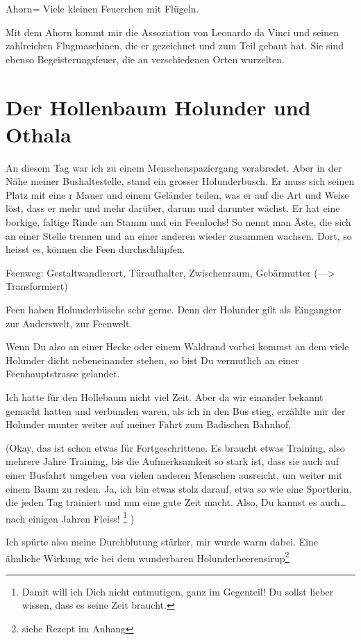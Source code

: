 \documentclass[11pt,titlepage,a5paper]{book}
\begin{document}
Ahorn= Viele kleinen Feuerchen mit Flügeln.

Mit dem Ahorn kommt mir die Assoziation von Leonardo da Vinci und seinen zahlreichen Flugmaschinen, die er gezeichnet und zum Teil gebaut hat. Sie sind ebenso Begeisterungsfeuer, die an verschiedenen Orten wurzelten.

\section{Der Hollenbaum Holunder und Othala  }

An diesem Tag war ich zu einem Menschenspaziergang verabredet. Aber in der Nähe meiner Bushaltestelle, stand ein grosser Holunderbusch. Er muss sich seinen Platz mit eine r Mauer und einem Geländer teilen, was er auf die Art und Weise löst, dass er mehr und mehr darüber, darum und darunter wächst. Er hat eine borkige, faltige Rinde am Stamm und ein Feenlochs! So nennt man Äste, die sich an einer Stelle trennen und an einer anderen wieder zusammen wachsen. Dort, so heisst es, können die Feen durchschlüpfen. 

Feenweg: Gestaltwandlerort, Türaufhalter, Zwischenraum, Gebärmutter (---> Transformiert)

Feen haben Holunderbüsche sehr gerne. Denn der Holunder gilt als Eingangtor zur Anderswelt, zur Feenwelt.

Wenn Du also an einer Hecke oder einem Waldrand vorbei kommst an dem viele Holunder dicht nebeneinander stehen, so bist Du vermutlich an einer Feenhauptstrasse gelandet.

Ich hatte für den Hollebaum nicht viel Zeit. Aber da wir einander bekannt gemacht hatten und verbunden waren,  als ich in den Bus stieg, erzählte mir der Holunder munter weiter auf meiner Fahrt zum Badischen Bahnhof.

(Okay, das ist schon etwas für Fortgeschrittene. Es braucht etwas Training, also mehrere Jahre Training, bis die Aufmerksamkeit so stark ist, dass sie auch auf einer Busfahrt umgeben von vielen anderen Menschen ausreicht, um weiter mit einem Baum zu reden. Ja, ich bin etwas stolz darauf, etwa so wie eine Sportlerin, die jeden Tag trainiert und nun eine gute Zeit macht. Also, Du kannst es auch\dots nach einigen Jahren Fleiss! \footnote{Damit will ich Dich nicht entmutigen, ganz im Gegenteil! Du sollst lieber wissen, dass es seine Zeit braucht.} )

Ich spürte also meine Durchblutung stärker, mir wurde warm dabei. Eine ähnliche Wirkung wie bei dem wunderbaren Holunderbeerensirup\footnote{siehe Rezept im Anhang}
\end{document}
